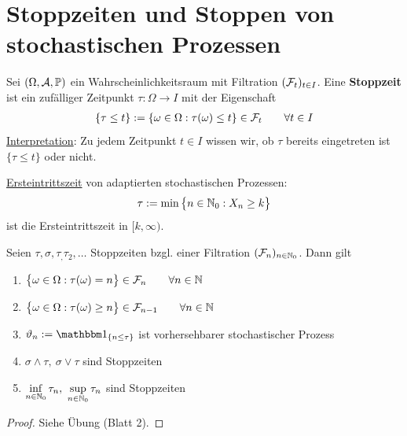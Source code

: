 
\chapter{Stoppzeiten und Stoppen von stochastischen Prozessen} %
\begin{defi}[Stoppzeit]\enter
Sei $(\Omega,\mathcal{A},\mathbb{P})$ ein Wahrscheinlichkeitsraum mit Filtration $(\mathcal{F}_t)_{t\in I}$. Eine \textbf{Stoppzeit} ist ein zufälliger Zeitpunkt $\tau:\Omega\to I$ mit der Eigenschaft
\begin{align*}
\lbrace\tau\leq t\rbrace:=\lbrace\omega\in\Omega:\tau(\omega)\leq t\rbrace\in\mathcal{F}_t\qquad\forall t\in I
\end{align*}
\ul{Interpretation}: Zu jedem Zeitpunkt $t\in I$ wissen wir, ob $\tau$ bereits eingetreten ist $\lbrace\tau\leq t\rbrace$ oder nicht.
\end{defi}

\begin{beisp}\enter
\ul{Ersteintrittszeit} von adaptierten stochastischen Prozessen:
\begin{align*}
\tau:=\min\big\lbrace n\in\mathbb{N}_0:X_n\geq k\big\rbrace
\end{align*}
ist die Ersteintrittszeit in $[k,\infty)$.
\end{beisp}

\setcounter{section}{3}
\begin{proposition}\label{prop3.1}
Seien $\tau,\sigma, \tau_,\tau_2,\ldots$ Stoppzeiten bzgl. einer Filtration $(\mathcal{F}_n)_{n\in\mathbb{N}_0}$. Dann gilt
\begin{enumerate}[label=(\alph*)]
\item $\begin{aligned}
\big\lbrace\omega\in\Omega:\tau(\omega)=n\big\rbrace\in\mathcal{F}_n\qquad\forall n\in\mathbb{N}
\end{aligned}$
\item $\begin{aligned}
\big\lbrace\omega\in\Omega:\tau(\omega)\geq n\big\rbrace\in\mathcal{F}_{n-1}\qquad\forall n\in\mathbb{N}
\end{aligned}$
\item $\begin{aligned}
\vartheta_n:=\indi_{\lbrace n\leq\tau\rbrace}
\end{aligned}$ ist vorhersehbarer stochastischer Prozess
\item $\sigma\wedge\tau,~\sigma\vee\tau$ sind Stoppzeiten
\item $\inf\limits_{n\in\mathbb{N}_0}\tau_n,~\sup\limits_{n\in\mathbb{N}_0}\tau_n$ sind Stoppzeiten
\end{enumerate}
\end{proposition}
\begin{proof}
Siehe Übung (Blatt 2).
\end{proof}

